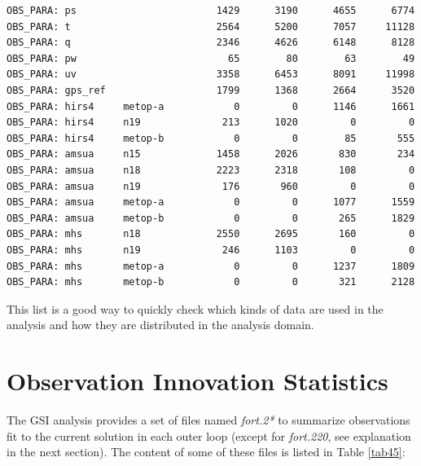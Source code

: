 \begin{scriptsize}
\begin{verbatim}
OBS_PARA: ps                        1429      3190      4655      6774
OBS_PARA: t                         2564      5200      7057     11128
OBS_PARA: q                         2346      4626      6148      8128
OBS_PARA: pw                          65        80        63        49
OBS_PARA: uv                        3358      6453      8091     11998
OBS_PARA: gps_ref                   1799      1368      2664      3520
OBS_PARA: hirs4     metop-a            0         0      1146      1661
OBS_PARA: hirs4     n19              213      1020         0         0
OBS_PARA: hirs4     metop-b            0         0        85       555
OBS_PARA: amsua     n15             1458      2026       830       234
OBS_PARA: amsua     n18             2223      2318       108         0
OBS_PARA: amsua     n19              176       960         0         0
OBS_PARA: amsua     metop-a            0         0      1077      1559
OBS_PARA: amsua     metop-b            0         0       265      1829
OBS_PARA: mhs       n18             2550      2695       160         0
OBS_PARA: mhs       n19              246      1103         0         0
OBS_PARA: mhs       metop-a            0         0      1237      1809
OBS_PARA: mhs       metop-b            0         0       321      2128
\end{verbatim}
\end{scriptsize}

This list is a good way to quickly check which kinds of data are used in the analysis and how they are distributed in the analysis domain.


\section{Observation Innovation Statistics}

The GSI analysis provides a set of files named \textit{fort.2*} to summarize observations fit to the current solution in each outer loop (except for \textit{fort.220}, see explanation in the next section). The content of some of these files is listed in Table \ref{tab45}:

